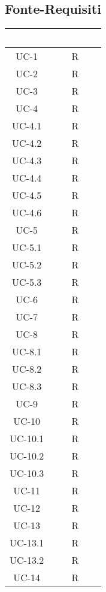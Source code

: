 \subsection{Fonte-Requisiti}
\renewcommand{\arraystretch}{1.5}
\begin{xltabular}{\textwidth}{|c | c |}
    \hline
     \textbf{\textcolor{white}{Fonte}} & \textbf{\textcolor{white}{Requisiti}}\\
    \hline
    \endhead
    UC-1 & R  \\
    \hline
    UC-2 & R  \\
    \hline
    UC-3 & R \\
    \hline
    UC-4 & R \\
    \hline
    UC-4.1 & R \\
    \hline
    UC-4.2 & R \\
    \hline
    UC-4.3 & R \\
    \hline
    UC-4.4 & R \\ 
    \hline
    UC-4.5 & R \\
    \hline
    UC-4.6 & R \\
    \hline
    UC-5 & R \\
    \hline
    UC-5.1 & R \\
    \hline
    UC-5.2 & R \\
    \hline
    UC-5.3 & R \\
    \hline
    UC-6 & R \\
    \hline
    UC-7 & R \\
    \hline
    UC-8 & R \\
    \hline
    UC-8.1 & R \\
    \hline
    UC-8.2 & R \\
    \hline
    UC-8.3 & R \\
    \hline
    UC-9 & R \\
    \hline
    UC-10 & R \\
    \hline
    UC-10.1 & R \\
    \hline
    UC-10.2 & R \\
    \hline
    UC-10.3 & R \\
    \hline
    UC-11 & R \\
    \hline
    UC-12 & R \\
    \hline
    UC-13 & R \\
    \hline
    UC-13.1 & R \\
    \hline
    UC-13.2 & R \\
    \hline
    UC-14 & R \\

\end{xltabular}
